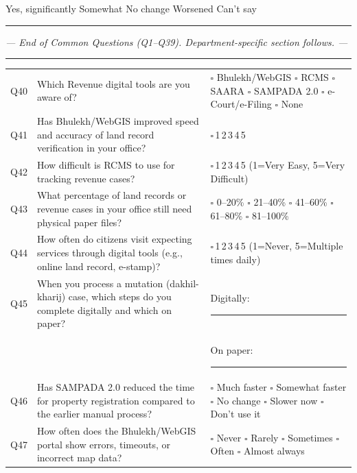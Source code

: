 \documentclass[10pt,a4paper]{article}
\newcommand{\likert}{{\Large$\square$}\,1\quad{\Large$\square$}\,2\quad{\Large$\square$}\,3\quad{\Large$\square$}\,4\quad{\Large$\square$}\,5}
\begin{document}
\noindent {\Large$\square$} Yes, significantly\quad{\Large$\square$} Somewhat\quad{\Large$\square$} No change\quad{\Large$\square$} Worsened\quad{\Large$\square$} Can't say

\vspace{4pt}\noindent\rule{\textwidth}{1pt}\vspace{2pt}
\begin{center}\textit{--- End of Common Questions (Q1--Q39). Department-specific section follows. ---}\end{center}
\rule{\textwidth}{0.5pt}
\newpage
{}\vspace{4pt}

\noindent\begin{tabularx}{\textwidth}{@{}L{0.6cm} X L{5.5cm}@{}}
Q40 & Which Revenue digital tools are you aware of? & {\Large$\square$} Bhulekh/WebGIS {\Large$\square$} RCMS {\Large$\square$} SAARA {\Large$\square$} SAMPADA 2.0 {\Large$\square$} e-Court/e-Filing {\Large$\square$} None \\[3pt]
Q41 & Has Bhulekh/WebGIS improved speed and accuracy of land record verification in your office? & \likert \\[3pt]
Q42 & How difficult is RCMS to use for tracking revenue cases? & \likert{} {\scriptsize(1=Very Easy, 5=Very Difficult)} \\[3pt]
Q43 & What percentage of land records or revenue cases in your office still need physical paper files? & {\Large$\square$} 0--20\% {\Large$\square$} 21--40\% {\Large$\square$} 41--60\% {\Large$\square$} 61--80\% {\Large$\square$} 81--100\% \\[3pt]
Q44 & How often do citizens visit expecting services through digital tools (e.g., online land record, e-stamp)? & \likert{} {\scriptsize(1=Never, 5=Multiple times daily)} \\[3pt]
Q45 & When you process a mutation (dakhil-kharij) case, which steps do you complete digitally and which on paper? & Digitally: \rule{6cm}{0.4pt}\\[2pt] && On paper: \rule{6cm}{0.4pt} \\[3pt]
Q46 & Has SAMPADA 2.0 reduced the time for property registration compared to the earlier manual process? & {\Large$\square$} Much faster {\Large$\square$} Somewhat faster {\Large$\square$} No change {\Large$\square$} Slower now {\Large$\square$} Don't use it \\[3pt]
Q47 & How often does the Bhulekh/WebGIS portal show errors, timeouts, or incorrect map data? & {\Large$\square$} Never {\Large$\square$} Rarely {\Large$\square$} Sometimes {\Large$\square$} Often {\Large$\square$} Almost always \\[3pt]

\end{tabularx}
\end{document}
